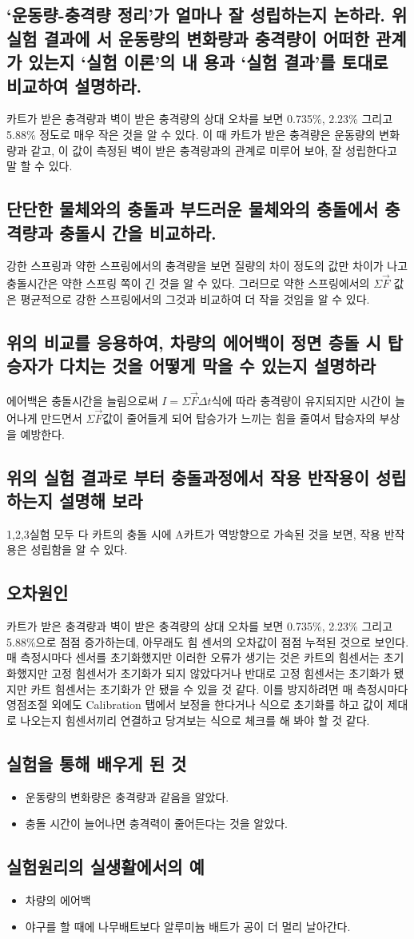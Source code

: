 \documentclass[12pt,a4paper]{article}
\begin{document}
\subsection{‘운동량-충격량 정리’가 얼마나 잘 성립하는지 논하라. 위 실험 결과에
    서 운동량의 변화량과 충격량이 어떠한 관계가 있는지 ‘실험 이론’의 내
    용과 ‘실험 결과’를 토대로 비교하여 설명하라.}
카트가 받은 충격량과 벽이 받은 충격량의 상대 오차를 보면 0.735\%, 2.23\% 그리고
5.88\% 정도로 매우 작은 것을 알 수 있다. 이 때 카트가 받은 충격량은 운동량의 변화량과
같고, 이 값이 측정된 벽이 받은 충격량과의 관계로 미루어 보아, 잘 성립한다고 말 할 수
있다.
\subsection{단단한 물체와의 충돌과 부드러운 물체와의 충돌에서 충격량과 충돌시
    간을 비교하라.}
강한 스프링과 약한 스프링에서의 충격량을 보면 질량의 차이 정도의 값만 차이가 나고
충돌시간은 약한 스프링 쪽이 긴 것을 알 수 있다. 그러므로 약한 스프링에서의
$\Sigma\vec{F}$ 값은 평균적으로 강한 스프링에서의 그것과 비교하여 더 작을 것임을
알 수 있다.
\subsection{위의 비교를 응용하여, 차량의 에어백이 정면 층돌 시 탑승자가 다치는
    것을 어떻게 막을 수 있는지 설명하라}
에어백은 충돌시간을 늘림으로써 $I=\Sigma\vec{F}\Delta t$식에 따라 충격량이
유지되지만 시간이 늘어나게 만드면서 $\Sigma\vec{F}$값이 줄어들게 되어 탑승가가
느끼는 힘을 줄여서 탑승자의 부상을 예방한다.
\subsection{위의 실험 결과로 부터 충돌과정에서 작용 반작용이 성립하는지 설명해
    보라}
1,2,3실험 모두 다 카트의 충돌 시에 A카트가 역방향으로 가속된 것을 보면, 작용 반작용은
성립함을 알 수 있다.
\subsection{오차원인}
카트가 받은 충격량과 벽이 받은 충격량의 상대 오차를 보면 0.735\%, 2.23\% 그리고
5.88\%으로 점점 증가하는데, 아무래도 힘 센서의 오차값이 점점 누적된 것으로 보인다.
매 측정시마다 센서를 초기화했지만 이러한 오류가 생기는 것은 카트의 힘센서는
초기화했지만 고정 힘센서가 초기화가 되지 않았다거나 반대로 고정 힘센서는 초기화가
됐지만 카트 힘센서는 초기화가 안 됐을 수 있을 것 같다. 이를 방지하려면 매 측정시마다
영점조절 외에도 Calibration 탭에서 보정을 한다거나 식으로 초기화를 하고 값이 제대로
나오는지 힘센서끼리 연결하고 당겨보는 식으로 체크를 해 봐야 할 것 같다.
\subsection{실험을 통해 배우게 된 것}
\begin{itemize}
    \item 운동량의 변화량은 충격량과 같음을 알았다.
    \item 충돌 시간이 늘어나면 충격력이 줄어든다는 것을 알았다.
\end{itemize}
\subsection{실험원리의 실생활에서의 예}
\begin{itemize}
    \item 차량의 에어백
    \item 야구를 할 때에 나무배트보다 알루미늄 배트가 공이 더 멀리 날아간다.
\end{itemize}
\end{document}

